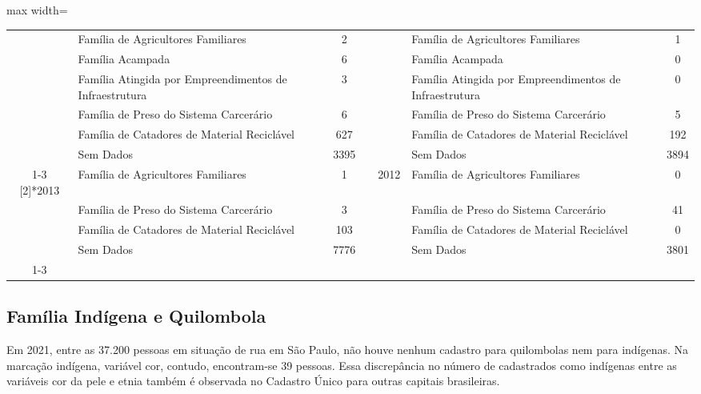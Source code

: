 \documentclass[14pt]{extarticle}
\begin{document}
\begin{table}[htbp]
\begin{adjustbox}{max width=\linewidth}
\begin{tabular}{clcrclc}
         & Família de Agricultores Familiares & 2    &      &      & Família de Agricultores Familiares & 1 \\
         & Família Acampada & 6    &      &      & Família Acampada & 0 \\
         & Família Atingida por Empreendimentos de Infraestrutura & 3    &      &      & Família Atingida por Empreendimentos de Infraestrutura & 0 \\
         & Família de Preso do Sistema Carcerário & 6    &      &      & Família de Preso do Sistema Carcerário & 5 \\
         & Família de Catadores de Material Reciclável & 627  &      &      & Família de Catadores de Material Reciclável & 192 \\
         & Sem Dados & 3395 &      &      & Sem Dados & 3894 \\
\cmidrule{1-3}\cmidrule{5-7}    \multirow{4}[2]{*}{2013} & Família de Agricultores Familiares & 1    &      & \multirow{4}[2]{*}{2012} & Família de Agricultores Familiares & 0 \\
         & Família de Preso do Sistema Carcerário & 3    &      &      & Família de Preso do Sistema Carcerário & 41 \\
         & Família de Catadores de Material Reciclável & 103  &      &      & Família de Catadores de Material Reciclável & 0 \\
         & Sem Dados & 7776 &      &      & Sem Dados & 3801 \\
\cmidrule{1-3}\cmidrule{5-7}    
\end{tabular}%
\end{adjustbox}
  \label{tab:tab_gte_num_abso}%
\end{table}



\subsection{Família Indígena e Quilombola}
%
\vspace{1cm}

\begin{mynote}
Em 2021, entre as 37.200 pessoas em situação de rua em São Paulo, não houve nenhum cadastro para quilombolas nem para indígenas. Na marcação indígena, variável cor, contudo, encontram-se 39 pessoas. Essa discrepância no número de cadastrados como indígenas entre as variáveis cor da pele e etnia também é observada no Cadastro Único para outras capitais brasileiras.

\end{mynote}
\end{document}
